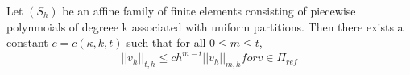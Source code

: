 \begin{thmx}
    Let $(S_h)$ be an affine family of finite elements consisting of piecewise polynmoials of degreee k associated with uniform partitions. Then there exists a constant $c = c(\kappa, k, t)$ such that for all $0 \leq m \leq t$,
    \begin{equation}
        {||v_h||}_{t,h} \leq ch^{m-t}||v_h||_{m,h} for v \in \Pi_{ref}
    \end{equation}
\end{thmx}